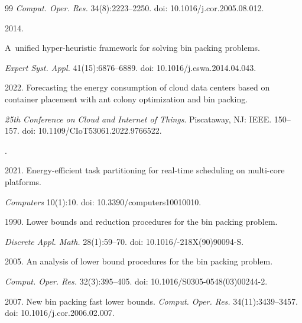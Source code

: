 {{\begin{thebibliography}{99}
 \textit{Comput. Oper. Res.}  34(8):2223--2250. doi: 10.1016\!/\!j.cor.2005.08.012.




 2014. 

A~unified hyper-heuristic framework for solving bin packing problems. 

\textit{Expert Syst. Appl.} 41(15):6876--6889. doi: 10.1016\!/\!j.eswa.2014.04.043.





 2022. Forecasting the energy consumption of cloud data centers based on container placement with ant colony optimization and bin packing. 

 \textit{25th Conference on Cloud and Internet of Things}. Piscataway, NJ: IEEE. 150--157. doi: 10.1109\!/\!CIoT53061.2022.9766522.




. 

2021. Energy-efficient task partitioning for real-time scheduling on multi-core platforms. 

\textit{Computers} 10(1):10. doi: 10.3390\!/\!computers10010010.




 1990. Lower bounds and reduction procedures for the bin packing problem. 

\textit{Discrete Appl. Math.} 28(1):59--70. doi: 10.1016\!/-218X(90)90094-S.




 2005. An analysis of lower bound procedures for the bin packing problem. 

\textit{Comput. Oper. Res.} 32(3):395--405. doi: 10.1016\!/\!S0305-0548(03)00244-2.





 2007. New bin packing fast lower bounds. \textit{Comput. Oper. Res.} 34(11):3439--3457. doi: 10.1016\!/\!j.cor.2006.02.007.




\end{thebibliography}}}
